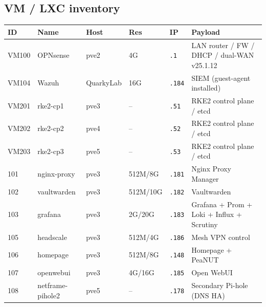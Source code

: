 \documentclass[11pt,letterpaper]{article}
\newcommand{\ip}[1]{\texttt{#1}}
\begin{document}
\subsection{VM / LXC inventory}
\begin{center}\footnotesize
\begin{tabularx}{\textwidth}{@{}l l l l l X@{}}
\toprule ID & Name & Host & Res & IP & Payload \\ \midrule
VM100 & OPNsense & pve2 & 4G & \ip{.1} & LAN router / FW / DHCP / dual-WAN v25.1.12 \\
VM104 & Wazuh & QuarkyLab & 16G & \ip{.184} & SIEM (guest-agent installed) \\
VM201 & rke2-cp1 & pve3 & -- & \ip{.51} & RKE2 control plane / etcd \\
VM202 & rke2-cp2 & pve4 & -- & \ip{.52} & RKE2 control plane / etcd \\
VM203 & rke2-cp3 & pve5 & -- & \ip{.53} & RKE2 control plane / etcd \\
101 & nginx-proxy & pve3 & 512M/8G & \ip{.181} & Nginx Proxy Manager \\
102 & vaultwarden & pve3 & 512M/10G & \ip{.182} & Vaultwarden \\
103 & grafana & pve3 & 2G/20G & \ip{.183} & Grafana + Prom + Loki + Influx + Scrutiny \\
105 & headscale & pve3 & 512M/4G & \ip{.186} & Mesh VPN control \\
106 & homepage & pve3 & 512M/8G & \ip{.148} & Homepage + PeaNUT \\
107 & openwebui & pve3 & 4G/16G & \ip{.185} & Open WebUI \\
108 & netframe-pihole2 & pve5 & -- & \ip{.178} & Secondary Pi-hole (DNS HA) \\
\bottomrule
\end{tabularx}
\end{center}

\end{document}
